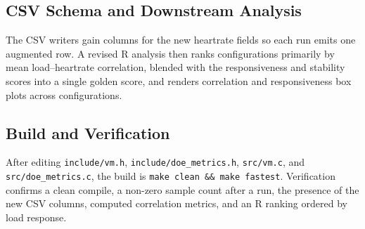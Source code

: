 \subsection{CSV Schema and Downstream Analysis}

The CSV writers gain columns for the new heartrate fields so each run emits one
augmented row. A revised R analysis then ranks configurations primarily by mean
load--heartrate correlation, blended with the responsiveness and stability
scores into a single golden score, and renders correlation and responsiveness
box plots across configurations.

\subsection{Build and Verification}

After editing \lstinline{include/vm.h}, \lstinline{include/doe_metrics.h},
\lstinline{src/vm.c}, and \lstinline{src/doe_metrics.c}, the build is
\lstinline{make clean && make fastest}. Verification confirms a clean compile,
a non-zero sample count after a run, the presence of the new CSV columns,
computed correlation metrics, and an R ranking ordered by load response.

